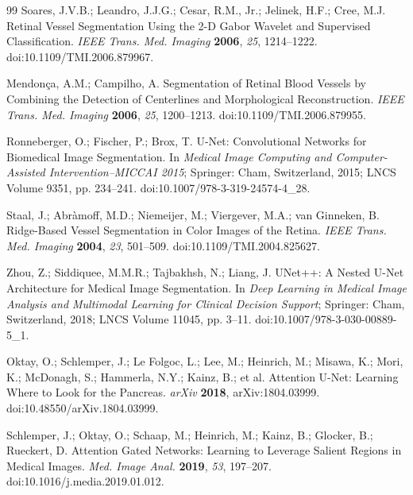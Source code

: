 \documentclass[jimaging,article,submit,pdftex,moreauthors]
  {Definitions/mdpi}
\providecommand{\href}[2]{#2}
\begin{document}
\begin{thebibliography}{99}
Soares, J.V.B.; Leandro, J.J.G.; Cesar, R.M., Jr.; Jelinek, H.F.; Cree, M.J. Retinal Vessel Segmentation Using the 2-D Gabor Wavelet and Supervised Classification. \textit{IEEE Trans. Med. Imaging} \textbf{2006}, \textit{25}, 1214--1222. \href{https://doi.org/10.1109/TMI.2006.879967}{doi:10.1109/TMI.2006.879967}.

Mendon\c{c}a, A.M.; Campilho, A. Segmentation of Retinal Blood Vessels by Combining the Detection of Centerlines and Morphological Reconstruction. \textit{IEEE Trans. Med. Imaging} \textbf{2006}, \textit{25}, 1200--1213. \href{https://doi.org/10.1109/TMI.2006.879955}{doi:10.1109/TMI.2006.879955}.

Ronneberger, O.; Fischer, P.; Brox, T. U-Net: Convolutional Networks for Biomedical Image Segmentation. In \textit{Medical Image Computing and Computer-Assisted Intervention--MICCAI 2015}; Springer: Cham, Switzerland, 2015; LNCS Volume 9351, pp. 234--241. \href{https://doi.org/10.1007/978-3-319-24574-4_28}{doi:10.1007/978-3-319-24574-4\_28}.

Staal, J.; Abr\`amoff, M.D.; Niemeijer, M.; Viergever, M.A.; van Ginneken, B. Ridge-Based Vessel Segmentation in Color Images of the Retina. \textit{IEEE Trans. Med. Imaging} \textbf{2004}, \textit{23}, 501--509. \href{https://doi.org/10.1109/TMI.2004.825627}{doi:10.1109/TMI.2004.825627}.

Zhou, Z.; Siddiquee, M.M.R.; Tajbakhsh, N.; Liang, J. UNet++: A Nested U-Net Architecture for Medical Image Segmentation. In \textit{Deep Learning in Medical Image Analysis and Multimodal Learning for Clinical Decision Support}; Springer: Cham, Switzerland, 2018; LNCS Volume 11045, pp. 3--11. \href{https://doi.org/10.1007/978-3-030-00889-5_1}{doi:10.1007/978-3-030-00889-5\_1}.

Oktay, O.; Schlemper, J.; Le Folgoc, L.; Lee, M.; Heinrich, M.; Misawa, K.; Mori, K.; McDonagh, S.; Hammerla, N.Y.; Kainz, B.; et al. Attention U-Net: Learning Where to Look for the Pancreas. \textit{arXiv} \textbf{2018}, arXiv:1804.03999. \href{https://doi.org/10.48550/arXiv.1804.03999}{doi:10.48550/arXiv.1804.03999}.

Schlemper, J.; Oktay, O.; Schaap, M.; Heinrich, M.; Kainz, B.; Glocker, B.; Rueckert, D. Attention Gated Networks: Learning to Leverage Salient Regions in Medical Images. \textit{Med. Image Anal.} \textbf{2019}, \textit{53}, 197--207. \href{https://doi.org/10.1016/j.media.2019.01.012}{doi:10.1016/j.media.2019.01.012}.


\end{thebibliography}
\end{document}
